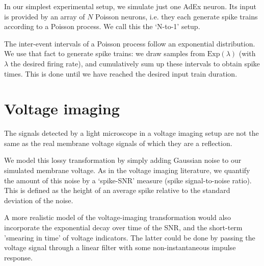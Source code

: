 In our simplest experimental setup, we simulate just one AdEx neuron.
Its input is provided by an array of $N$ Poisson neurons, i.e. they each generate spike trains according to a Poisson process. We call this the `N-to-1' setup.

The inter-event intervals of a Poisson process follow an exponential distribution.
We use that fact to generate spike trains: we draw samples from $\mathrm{Exp}(\lambda)$ (with $\lambda$ the desired firing rate), and cumulatively sum up these intervals  to obtain spike times. This is done until we have reached the desired input train duration.


\section{Voltage imaging}

The signals detected by a light microscope in a voltage imaging setup are not the same as the real membrane voltage signals of which they are a reflection.

We model this lossy transformation by simply adding Gaussian noise to our simulated membrane voltage. As in the voltage imaging literature, we quantify the amount of this  noise by a `spike-SNR' measure (spike signal-to-noise ratio). This is defined as the height of an average spike relative to the standard deviation of the noise.

A more realistic model of the voltage-imaging transformation would also incorporate the exponential decay over time of the SNR, and the short-term 'smearing in time' of voltage indicators. The latter could be done by passing the voltage signal through a linear filter with some non-instantaneous impulse response.
